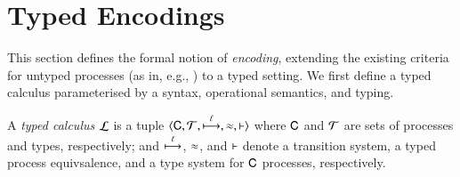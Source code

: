 
\section{Typed Encodings}\label{s:expr}
This section defines the formal notion of \emph{encoding}, 
extending the existing criteria for untyped processes (as in, e.g.,
\cite{Nestmann00,Palamidessi03,DBLP:conf/lics/PalamidessiSVV06,DBLP:journals/iandc/Gorla10,DBLP:conf/icalp/LanesePSS10}) to a typed setting. 
We first define a typed calculus parameterised by a syntax, operational semantics, and typing.



\begin{definition}\label{d:tcalculus}\rm
	A \emph{typed calculus} $\mathcal{L}$ is a tuple
          $\langle \mathsf{C}, \cal{T}, \stackrel{\ell}{\longmapsto}, \approx, \vdash \rangle$
	where $\mathsf{C}$ and $\cal{T}$ are sets of processes and types, 
respectively; and $\stackrel{\ell}{\longmapsto}$, $\approx$, and $\vdash$ 
	denote a transition system, a typed process equivsalence, and a type system for $\mathsf{C}$ processes, respectively. 
\end{definition}





%

